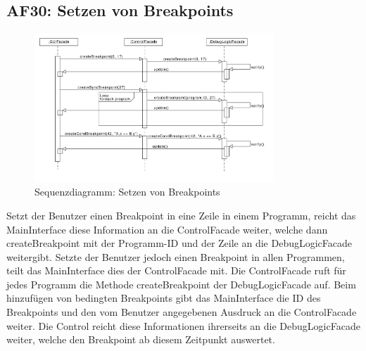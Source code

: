 \documentclass[parskip=full]{scrartcl}
\begin{document}
\newpage
\subsection{AF30: Setzen von Breakpoints}
\begin{figure}[!h]
\centering
\includegraphics[width=0.8\textwidth]{diagrammIdeenUmlet/SequenceDiagrams/seq_breakpointsPDF.pdf}
\caption{Sequenzdiagramm: Setzen von Breakpoints}
\end{figure}
Setzt der Benutzer einen Breakpoint in eine Zeile in einem Programm, reicht das MainInterface
diese Information an die ControlFacade weiter, welche dann createBreakpoint mit der Programm-ID und der
Zeile an die DebugLogicFacade weitergibt.
Setzte der Benutzer jedoch einen Breakpoint in allen Programmen, teilt das
MainInterface dies der ControlFacade mit. Die ControlFacade ruft für jedes Programm
die Methode createBreakpoint der DebugLogicFacade auf.
Beim hinzufügen von bedingten Breakpoints gibt das MainInterface die ID des Breakpoints
und den vom Benutzer angegebenen Ausdruck an die ControlFacade weiter. Die Control reicht diese Informationen
ihrerseits an die DebugLogicFacade weiter, welche den Breakpoint ab diesem Zeitpunkt auswertet.

\newpage
\end{document}
